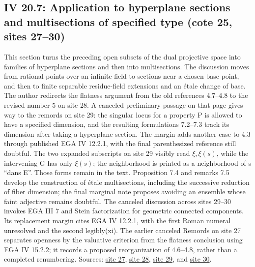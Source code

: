 \subsection*{IV 20.7: Application to hyperplane sections and multisections of specified type (cote 25, sites 27--30)}
This section turns the preceding open subsets of the dual projective space into families of hyperplane sections and then into multisections. The discussion moves from rational points over an infinite field to sections near a chosen base point, and then to finite separable residue-field extensions and an étale change of base. The author redirects the flatness argument from the old references 4.7--4.8 to the revised number 5 on site 28. A canceled preliminary passage on that page gives way to the remords on site 29: the singular locus for a property P is allowed to have a specified dimension, and the resulting formulations 7.2--7.3 track its dimension after taking a hyperplane section. The margin adds another case to 4.3 through published EGA IV 12.2.1, with the final parenthesized reference still doubtful. The two expanded subscripts on site 29 visibly read $\xi,\xi(s)$, while the intervening G has only $\xi(s)$; the neighborhood is printed as a neighborhood of s ``dans E''. Those forms remain in the text. Proposition 7.4 and remarks 7.5 develop the construction of étale multisections, including the successive reduction of fiber dimension; the final marginal note proposes avoiding an ensemble whose faint adjective remains doubtful. The canceled discussion across sites 29--30 invokes EGA III 7 and Stein factorization for geometric connected components. Its replacement margin cites EGA IV 12.2.1, with the first Roman numeral unresolved and the second legibly(xi). The earlier canceled Remords on site 27 separates openness by the valuative criterion from the flatness conclusion using EGA IV 15.2.2; it records a proposed reorganization of 4.6--4.8, rather than a completed renumbering. Sources: \href{https://grothendieck.umontpellier.fr/web/viewer.html?file=../25.pdf\#page=28}{site 27}, \href{https://grothendieck.umontpellier.fr/web/viewer.html?file=../25.pdf\#page=29}{site 28}, \href{https://grothendieck.umontpellier.fr/web/viewer.html?file=../25.pdf\#page=30}{site 29}, and \href{https://grothendieck.umontpellier.fr/web/viewer.html?file=../25.pdf\#page=31}{site 30}.
